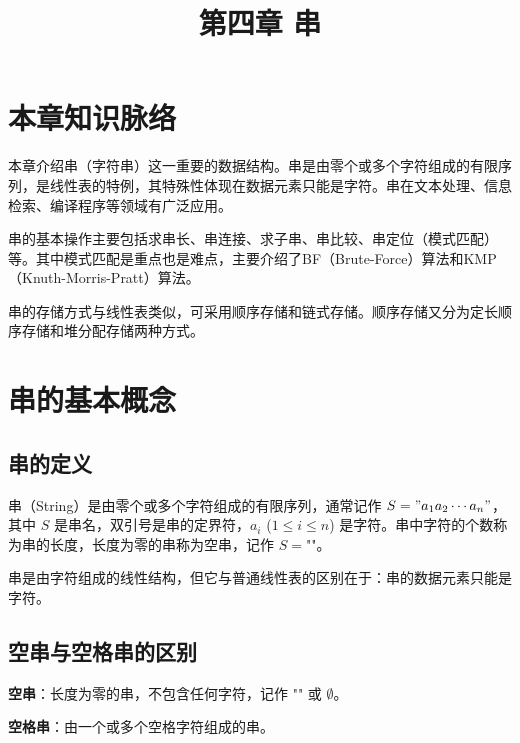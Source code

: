 \documentclass[12pt, a4paper]{article}
\title{\textbf{第四章 串}}
\author{}
\date{}
\begin{document}
\maketitle

\section*{本章知识脉络}

本章介绍串（字符串）这一重要的数据结构。串是由零个或多个字符组成的有限序列，是线性表的特例，其特殊性体现在数据元素只能是字符。串在文本处理、信息检索、编译程序等领域有广泛应用。

\vspace{1em}

串的基本操作主要包括求串长、串连接、求子串、串比较、串定位（模式匹配）等。其中模式匹配是重点也是难点，主要介绍了BF（Brute-Force）算法和KMP（Knuth-Morris-Pratt）算法。

\vspace{1em}

串的存储方式与线性表类似，可采用顺序存储和链式存储。顺序存储又分为定长顺序存储和堆分配存储两种方式。

\section{串的基本概念}

\subsection{串的定义}

串（String）是由零个或多个字符组成的有限序列，通常记作 $S="a_1a_2\cdots a_n"$，其中 $S$ 是串名，双引号是串的定界符，$a_i$ ($1 \le i \le n$) 是字符。串中字符的个数称为串的长度，长度为零的串称为空串，记作 $S=\texttt{""}$。

\vspace{1em}

串是由字符组成的线性结构，但它与普通线性表的区别在于：串的数据元素只能是字符。

\subsection{空串与空格串的区别}

\textbf{空串}：长度为零的串，不包含任何字符，记作 $\texttt{""}$ 或 $\emptyset$。

\textbf{空格串}：由一个或多个空格字符组成的串。

\vspace{1em}
\end{document}
